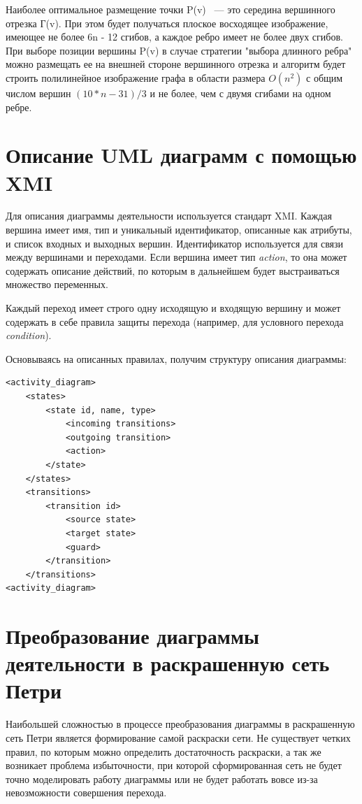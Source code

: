 Наиболее оптимальное размещение точки P(v) ~--- это середина вершинного отрезка Г(v). При этом будет получаться плоское восходящее изображение, имеющее не более 6n - 12 сгибов, а каждое ребро имеет не более двух сгибов. При выборе позиции вершины P(v) в случае стратегии "выбора длинного ребра" можно размещать ее на внешней стороне вершинного отрезка и алгоритм будет строить полилинейное изображение графа в области размера $ O(n^{2}) $ с общим числом вершин $ (10 * n - 31) / 3 $ и не более, чем с двумя сгибами на одном ребре.

\section{Описание UML диаграмм с помощью XMI}

Для описания диаграммы деятельности используется стандарт XMI. Каждая вершина имеет имя, тип и уникальный идентификатор, описанные как атрибуты, и список входных и выходных вершин. Идентификатор используется для связи между вершинами и переходами. Если вершина имеет тип \textit{action}, то она может содержать описание действий, по которым в дальнейшем будет выстраиваться множество переменных.

Каждый переход имеет строго одну исходящую и входящую вершину и может содержать в себе правила защиты перехода (например, для условного перехода \textit{condition}).

Основываясь на описанных правилах, получим структуру описания диаграммы:

\begin{verbatim}
<activity_diagram>
    <states>
        <state id, name, type>
            <incoming transitions>
            <outgoing transition>
            <action>
        </state>
    </states>
    <transitions>
        <transition id>
            <source state>
            <target state>
            <guard>
        </transition>
    </transitions>
<activity_diagram>
\end{verbatim}

\section{Преобразование диаграммы деятельности в раскрашенную сеть Петри}

Наибольшей сложностью в процессе преобразования диаграммы в раскрашенную сеть Петри является формирование самой раскраски сети. Не существует четких правил, по которым можно определить достаточность раскраски, а так же возникает проблема избыточности, при которой сформированная сеть не будет точно моделировать работу диаграммы или не будет работать вовсе из-за невозможности совершения перехода.

